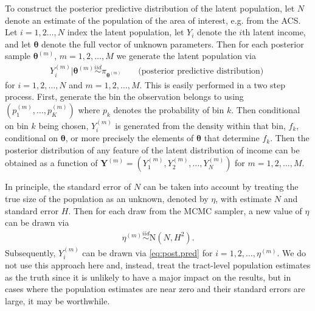 \documentclass[12pt]{article}
\begin{document}
To construct the posterior predictive distribution of the latent population, let $N$ denote an estimate of the population of the area of interest, e.g. from the ACS. Let $i=1,2\dots,N$ index the latent population, let $Y_i$ denote the $i$th latent income, and let $\bm{\theta}$ denote the full vector of unknown parameters. Then for each posterior sample $\bm{\theta}^{(m)}$, $m=1,2,\dots,M$ we generate the latent population via
\begin{align}
Y_i^{(m)} |\bm{\theta}^{(m)} \stackrel{iid}{\sim} \pi_{\bm{\theta}^{(m)}} && \mbox{ (posterior predictive distribution) }\label{eq:post.pred}
\end{align}
for $i=1,2,\dots,N$ and $m=1,2,\dots,M$. This is easily performed in a two step process. First, generate the bin the observation belongs to using $(p_1^{(m)}, \dots, p_K^{(m)})$ where $p_k$ denotes the probability of bin $k$. Then conditional on bin $k$ being chosen, $Y_i^{(m)}$ is generated from the density within that bin, $f_k$, conditional on $\bm{\theta}$, or more precisely the elements of $\bm{\theta}$ that determine $f_k$. Then the posterior distribution of any feature of the latent distribution of income can be obtained as a function of $\bm{Y}^{(m)} = (Y_1^{(m)}, Y_2^{(m)}, \dots, Y_N^{(m)})$ for $m=1,2,\dots,M$.

In principle, the standard error of $N$ can be taken into account by treating the true size of the population as an unknown, denoted by $\eta$, with estimate $N$ and standard error $H$. Then for each draw from the MCMC sampler, a new value of $\eta$ can be drawn via
\begin{align*}
\eta^{(m)} \stackrel{iid}{\sim}\mathrm{N}(N, H^2).
\end{align*}
Subsequently, $Y_i^{(m)}$ can be drawn via \eqref{eq:post.pred} for $i=1,2,\dots,\eta^{(m)}$. We do not use this approach here and, instead, treat the tract-level population estimates as the truth since it is unlikely to have a major impact on the results, but in cases where the population estimates are near zero and their standard errors are large, it may be worthwhile.
\end{document}
